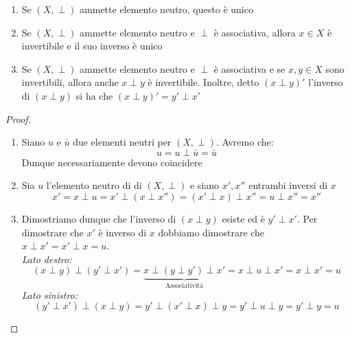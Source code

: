 \documentclass[11pt,a4paper]{article}
\theoremstyle{plain}
\theoremstyle{remark}
\theoremstyle{definition}
\newenvironment{proposizione}[1]
{\renewcommand{\thepropmanuale}{#1}\propmanuale}
{\endpropmanuale}
\theoremstyle{definition}
\theoremstyle{plain}
\begin{document}
	\begin{proposizione}{2.3}
		 \leavevmode\vspace{-0.5\baselineskip}
		\begin{enumerate}[label=\roman*)]
			
			\item Se $(X, \perp)$ ammette elemento neutro, questo è unico
			
			\item Se $(X, \perp)$ ammette elemento neutro e $\perp$ è associativa, allora $x \in X$ è invertibile e il suo inverso è unico
			
			\item Se $(X, \perp)$ ammette elemento neutro e $\perp$ è associativa e se $x,y \in X$ sono invertibili, allora anche $x \perp y$ è invertibile. Inoltre, detto $(x \perp y)'$ l'inverso di $(x \perp y)$ si ha che $(x \perp y)' = y' \perp x'$
		\end{enumerate}
	\end{proposizione}
	
	\begin{proof}
		\leavevmode\vspace{-0.5\baselineskip}
		\begin{enumerate}[label=\roman*)]
			
			\item Siano $u$ e $\bar{u}$ due elementi neutri per $(X, \perp)$. Avremo che:
			$$ u = u \perp \bar{u} = \bar{u} $$
			Dunque necessariamente devono coincidere
			
			\item Sia $u$ l'elemento neutro di di $(X, \perp)$ e siano $x', x''$ entrambi inversi di $x$
			$$x' = x \perp u = x' \perp (x \perp x'') = (x' \perp x) \perp x'' = u \perp x'' = x''$$
			
			\item Dimostriamo dunque che l'inverso di $(x \perp y)$ esiste ed è $y' \perp x'$. Per dimostrare che $x'$ è inverso di $x$ dobbiamo dimostrare che $x \perp x' = x' \perp x = u$.
			\\
			\textit{Lato destro:}
			$$ (x \perp y) \perp (y' \perp x') = \underbrace{x \perp (y \perp y') \perp x'}_{\text{Associatività}} = x \perp u \perp x' = x \perp x' = u $$
			\textit{Lato sinistro:}
			$$(y' \perp x') \perp (x \perp y) = y' \perp (x' \perp x) \perp y = y' \perp u \perp y = y' \perp y = u$$
		\end{enumerate}
	\end{proof}
	
\end{document}
